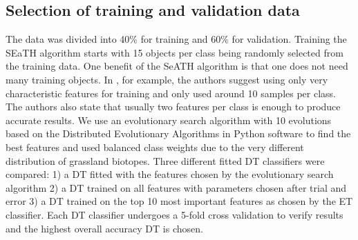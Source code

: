\documentclass[authoryear, review,12pt,number]{elsarticle}
\begin{document}
\subsection{Selection of training and validation data}
The data was divided into 40\% for training and 60\% for validation. 
Training the SEaTH algorithm starts with 15 objects per class being randomly 
selected from the training data. One benefit of the SeATH algorithm is that one 
does not need many training objects. In \cite{Nussbaum2006}, for example, the 
authors suggest using only very characteristic features for training and only 
used around 10 samples per class. The authors also state that usually two 
features per class is enough to produce accurate results.
We use an evolutionary search algorithm with 10 evolutions based on the 
Distributed Evolutionary Algorithms in Python \citep{DEAP_JMLR2012} software to 
find the best features and used balanced class weights due to the very 
different distribution of grassland biotopes.  Three different fitted DT 
classifiers were compared: 1) a DT fitted with the features chosen by the 
evolutionary search algorithm 2) a DT trained on all features with parameters 
chosen after trial and error 3) a DT trained on the top 10 most important 
features as chosen by the ET classifier. Each DT classifier undergoes a 5-fold 
cross validation to verify results and the highest overall accuracy DT is 
chosen.
\label{subsec:rulegen_data_mining}
\end{document}
